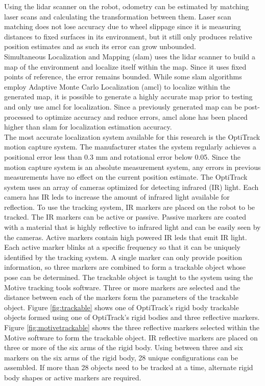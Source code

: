 Using the \acrshort{lidar} scanner on the robot, odometry can be estimated by matching laser scans and calculating the transformation between them. Laser scan matching does not lose accuracy due to wheel slippage since it is measuring distances to fixed surfaces in its environment, but it still only produces relative position estimates and as such its error can grow unbounded.\\

Simultaneous Localization and Mapping (\acrshort{slam}) uses the \acrshort{lidar} scanner to build a map of the environment and localize itself within the map. Since it uses fixed points of reference, the error remains bounded. While some \acrshort{slam} algorithms employ Adaptive Monte Carlo Localization (\acrshort{amcl}) to localize within the generated map, it is possible to generate a highly accurate map prior to testing and only use \acrshort{amcl} for localization. Since a previously generated map can be post-processed to optimize accuracy and reduce errors, \acrshort{amcl} alone has been placed higher than \acrshort{slam} for localization estimation accuracy.\\

The most accurate localization system available for this research is the OptiTrack motion capture system. The manufacturer states the system regularly achieves a positional error less than 0.3 mm and rotational error below 0.05\degree. Since the motion capture system is an absolute measurement system, any errors in previous measurements have no effect on the current position estimate. The OptiTrack system uses an array of cameras optimized for detecting infrared (IR) light. Each camera has IR \acrshort{led}s to increase the amount of infrared light available for reflection. To use the tracking system, IR markers are placed on the robot to be tracked. The IR markers can be active or passive. Passive markers are coated with a material that is highly reflective to infrared light and can be easily seen by the cameras. Active markers contain high powered IR \acrshort{led}s that emit IR light. Each active marker blinks at a specific frequency so that it can be uniquely identified by the tracking system. A single marker can only provide position information, so three markers are combined to form a trackable object whose pose can be determined. The trackable object is taught to the system using the Motive tracking tools software. Three or more markers are selected and the distance between each of the markers form the parameters of the trackable object. Figure \ref{fig:trackable} shows one of OptiTrack's rigid body trackable objects formed using one of OptiTrack's rigid bodies and three reflective markers. Figure \ref{fig:motivetrackable} shows the three reflective markers selected within the Motive software to form the trackable object. IR reflective markers are placed on three or more of the six arms of the rigid body. Using between three and six markers on the six arms of the rigid body, 28 unique configurations can be assembled. If more than 28 objects need to be tracked at a time, alternate rigid body shapes or active markers are required.\\

